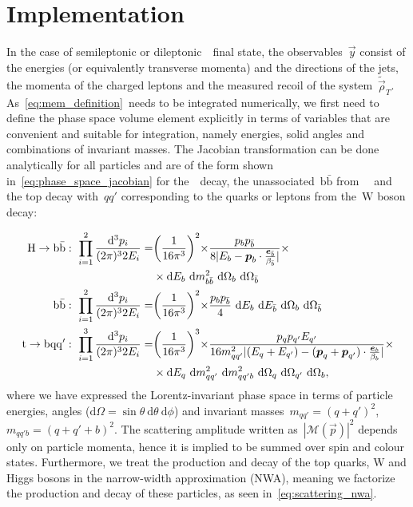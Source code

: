 \section{Implementation}
\label{sec:mem_implementation}
In the case of semileptonic or dileptonic~\ttH~final state, the observables~$\vec{y}$ consist of the energies (or equivalently transverse momenta) and the directions of the jets, the momenta of the charged leptons and the measured recoil of the system~$\tilde{\vec{\rho}}_T$. As~\cref{eq:mem_definition}~needs to be integrated numerically, we first need to define the phase space volume element explicitly in terms of variables that are convenient and suitable for integration, namely energies, solid angles and combinations of invariant masses. The Jacobian transformation can be done analytically for all particles and are of the form shown in~\cref{eq:phase_space_jacobian} for the~\Hbb~decay, the unassociated~$\mathrm{b}\bar{\mathrm{b}}$ from~\ttbb~ and the top decay with~$qq'$ corresponding to the quarks or leptons from the~$\mathrm{W}$ boson decay:

\begin{align}
\label{eq:phase_space_jacobian}
\mathrm{H} \rightarrow \mathrm{b}\bar{\mathrm{b}}:\ \prod_{i=1}^{2} \frac{\mathrm{d}^3 p_i}{(2\pi)^3 2 E_i} =& \biggr(\frac{1}{16 \pi^3}\biggl)^2 \times \frac{p_b p_{\bar{b}}}{8 |E_b - \boldsymbol{p}_b \cdot \frac{\boldsymbol{e}_{\bar{b}}}{\beta_{\bar{b}}}|} \times \\
&\times\mathrm{d}E_{b}~\mathrm{d}m^2_{b\bar{b}}~\mathrm{d}\Omega_{b}~\mathrm{d}\Omega_{\bar{b}} \\
\mathrm{b}\bar{\mathrm{b}}:\ \prod_{i=1}^{2} \frac{\mathrm{d}^3 p_i}{(2\pi)^3 2 E_i} =& \biggr(\frac{1}{16 \pi^3}\biggl)^2 \times \frac{p_b p_{\bar{b}}}{4}~\mathrm{d}E_{b}~\mathrm{d}E_{\bar{b}}~\mathrm{d}\Omega_{b}~\mathrm{d}\Omega_{\bar{b}} \\
\mathrm{t} \rightarrow \mathrm{b}\mathrm{q}\mathrm{q}':\ \prod_{i=1}^{3} \frac{\mathrm{d}^3 p_i}{(2\pi)^3 2 E_i} =& \biggr(\frac{1}{16 \pi^3}\biggl)^3 \times \frac{p_q p_{q'} E_{q'}}{16 m_{qq'}^2 |(E_q + E_{q'}) - (\boldsymbol{p}_q + \boldsymbol{p}_{q'})\cdot \frac{\boldsymbol{e}_b}{\beta_b}|}\times\\
&\times\mathrm{d}E_{q}~\mathrm{d}m^2_{qq'}~\mathrm{d}m^2_{qq'b}~\mathrm{d}\Omega_{q}~\mathrm{d}\Omega_{q'}~\mathrm{d}\Omega_b,
\end{align}
where we have expressed the Lorentz-invariant phase space in terms of particle energies, angles ($\mathrm{d}\Omega = \sin{\theta}~\mathrm{d}\theta~\mathrm{d}\phi$) and invariant masses~$m_{qq'} = (q+q')^2$,~$m_{qq'b} = (q + q' + b)^2$.
The scattering amplitude written as~$|\mathcal{M}(\vec{p})|^2$ depends only on particle momenta, hence it is implied to be summed over spin and colour states. Furthermore, we treat the production and decay of the top quarks, W and Higgs bosons in the narrow-width approximation (NWA), meaning we factorize the production and decay of these particles, as seen in~\cref{eq:scattering_nwa}.


